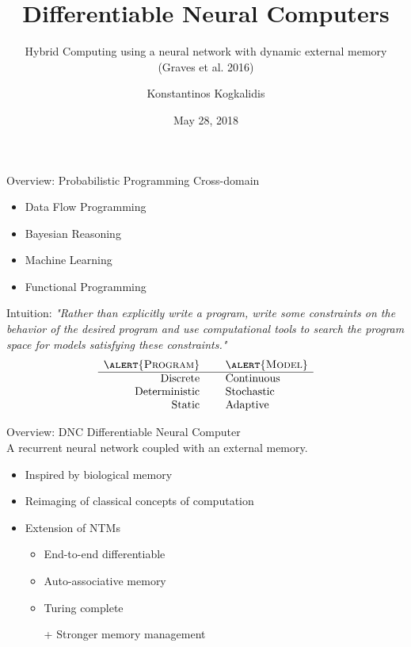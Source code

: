 \documentclass{beamer}
\title{Differentiable Neural Computers}
\subtitle{Hybrid Computing using a neural network with dynamic external memory (Graves et al. 2016)}
\author{Konstantinos Kogkalidis}
\date{May 28, 2018}
\institute{Logic and Computation}
\begin{document}
	\maketitle
	
\begin{frame}{Overview: Probabilistic Programming}
	\alert{Cross-domain}
	\begin{itemize}
	\item Data Flow Programming
	\item Bayesian Reasoning
	\item Machine Learning
	\item Functional Programming
	\end{itemize}
	\pause
	Intuition:
	\textit{"Rather than explicitly write a program, write some \alert{constraints} on the behavior of the desired program and use computational tools to search the program space for \alert{models} satisfying these constraints."}
	\pause
	\[\begin{array}{rcl}
	\textsc{\alert{Program}} &\ & \textsc{\alert{Model}}\\
	\hline
	\text{Discrete} &\ & \text{Continuous}\\
	\text{Deterministic} &\ & \text{Stochastic}\\
	\text{Static} &\ & \text{Adaptive}\\
	\end{array}\]
\end{frame}

\begin{frame}{Overview: DNC}
	\alert{Differentiable Neural Computer}\\
	A recurrent neural network coupled with an external memory.
	
	\pause
	\begin{itemize}
	\item Inspired by biological memory
	\item Reimaging of classical concepts of computation
	\item Extension of NTMs
	\begin{itemize}
		\item End-to-end differentiable
		\item Auto-associative memory
		\item Turing complete
		\item[+] Stronger memory management
	\end{itemize}
	\end{itemize}
\end{frame}
\end{document}
